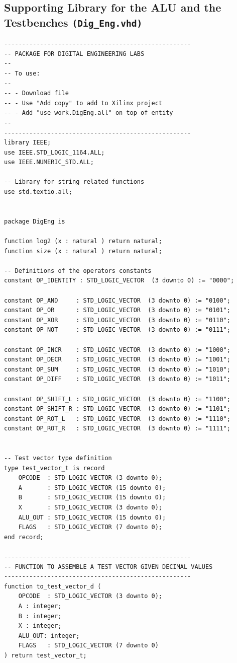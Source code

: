 \documentclass[10pt]{article}
\begin{document}
\subsection{Supporting Library for the ALU and the Testbenches \texttt{(Dig\_Eng.vhd)}}
\begin{verbatim}
----------------------------------------------------
-- PACKAGE FOR DIGITAL ENGINEERING LABS
--
-- To use:
--
-- - Download file
-- - Use "Add copy" to add to Xilinx project
-- - Add "use work.DigEng.all" on top of entity
--
----------------------------------------------------
library IEEE;
use IEEE.STD_LOGIC_1164.ALL;
use IEEE.NUMERIC_STD.ALL;

-- Library for string related functions
use std.textio.all;


package DigEng is

function log2 (x : natural ) return natural;
function size (x : natural ) return natural;

-- Definitions of the operators constants
constant OP_IDENTITY : STD_LOGIC_VECTOR  (3 downto 0) := "0000";

constant OP_AND     : STD_LOGIC_VECTOR  (3 downto 0) := "0100";
constant OP_OR      : STD_LOGIC_VECTOR  (3 downto 0) := "0101";
constant OP_XOR     : STD_LOGIC_VECTOR  (3 downto 0) := "0110";
constant OP_NOT     : STD_LOGIC_VECTOR  (3 downto 0) := "0111";

constant OP_INCR    : STD_LOGIC_VECTOR  (3 downto 0) := "1000";
constant OP_DECR    : STD_LOGIC_VECTOR  (3 downto 0) := "1001";
constant OP_SUM     : STD_LOGIC_VECTOR  (3 downto 0) := "1010";
constant OP_DIFF    : STD_LOGIC_VECTOR  (3 downto 0) := "1011";

constant OP_SHIFT_L : STD_LOGIC_VECTOR  (3 downto 0) := "1100";
constant OP_SHIFT_R : STD_LOGIC_VECTOR  (3 downto 0) := "1101";
constant OP_ROT_L   : STD_LOGIC_VECTOR  (3 downto 0) := "1110";
constant OP_ROT_R   : STD_LOGIC_VECTOR  (3 downto 0) := "1111";


-- Test vector type definition
type test_vector_t is record
    OPCODE  : STD_LOGIC_VECTOR (3 downto 0); 
    A       : STD_LOGIC_VECTOR (15 downto 0);
    B       : STD_LOGIC_VECTOR (15 downto 0);
    X       : STD_LOGIC_VECTOR (3 downto 0);
    ALU_OUT : STD_LOGIC_VECTOR (15 downto 0);
    FLAGS   : STD_LOGIC_VECTOR (7 downto 0);
end record;

----------------------------------------------------
-- FUNCTION TO ASSEMBLE A TEST VECTOR GIVEN DECIMAL VALUES
----------------------------------------------------
function to_test_vector_d (
    OPCODE  : STD_LOGIC_VECTOR (3 downto 0);
    A : integer;
    B : integer;
    X : integer;
    ALU_OUT: integer;
    FLAGS   : STD_LOGIC_VECTOR (7 downto 0)
) return test_vector_t;


\end{verbatim}
\end{document}
